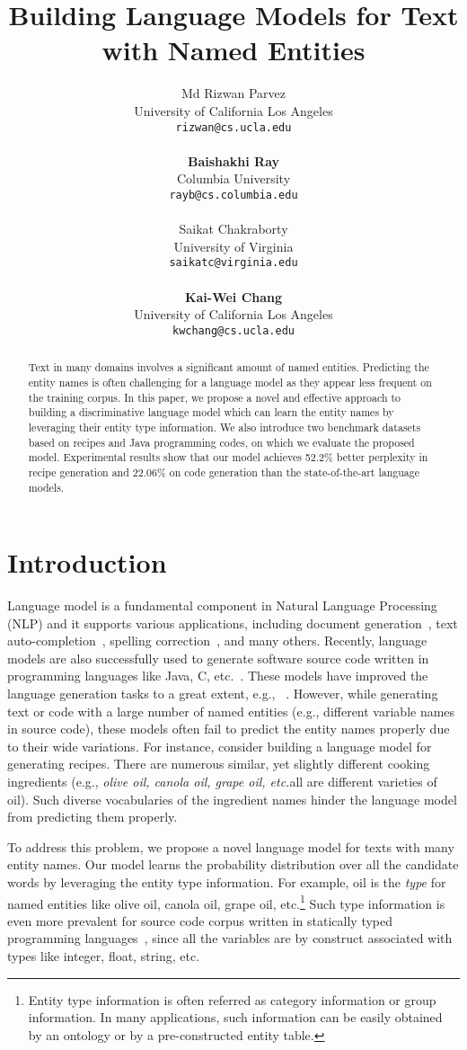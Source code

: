 \documentclass[11pt,a4paper]{article}
\title{Building Language Models for Text with Named Entities}
\author{
Md Rizwan Parvez \\
University of California Los Angeles \\
 {\tt rizwan@cs.ucla.edu} \\ 
 \\
  {\bf Baishakhi Ray}
\\
Columbia University  \\
 {\tt rayb@cs.columbia.edu} \\ 
 \\ \And Saikat Chakraborty \\
University of Virginia \\
 {\tt saikatc@virginia.edu} \\
 \\
{\bf Kai-Wei Chang}\\
University of California Los Angeles \\
 {\tt kwchang@cs.ucla.edu}
}
\date{}
\begin{document}
\maketitle
\begin{abstract}

Text in many domains involves a significant amount of named entities. Predicting the entity names is often challenging for a language model as they appear less frequent on the training corpus. In this paper, we propose a novel and effective approach to building a discriminative language model which can learn the entity names by leveraging their entity type information. We also introduce two benchmark datasets based on recipes and Java programming codes, on which we evaluate the proposed model. Experimental results show that our model achieves 52.2\% better perplexity in recipe generation and 22.06\% on code generation than the state-of-the-art language models.
\end{abstract}


\section{Introduction}


Language model is a fundamental component in Natural Language Processing (NLP) and it supports various applications, including document generation~\cite{Harvard_data_to_document}, text auto-completion~\cite{ACK17}, spelling correction~\cite{spelling}, and many others. Recently, language models are also successfully used to generate software source code written in programming languages like Java, C, etc.~\cite{naturalnessofsoft,cmu_code_gen,deep_net_for_source_code,code_gen_parsing}. These models have improved the language generation tasks to a great extent, e.g., ~\cite{mikolov2010,Sordoni}. However, while generating text or code with a large number of named entities (e.g., different variable names in source code), these models often fail to predict the entity names properly due to their wide variations.  For instance, consider building a language model for generating recipes. There are numerous similar, yet slightly different cooking ingredients  (e.g., {\it olive oil, canola oil, grape oil, etc.}\textemdash all are different varieties of oil). Such diverse  vocabularies of the ingredient names hinder the language model from predicting them properly. 






To address this problem, we propose a novel language model for texts with many entity names. Our model learns the probability distribution over all the candidate words by leveraging the entity type information. For example, oil is the {\em type} for named entities like olive oil, canola oil, grape oil, etc.\footnote{Entity type information is often referred as category information or group information. In many applications, such information can be easily obtained by an ontology or by a pre-constructed entity table.} 
Such type information is even more prevalent for source code corpus written in statically typed programming languages~\cite{bruce1993safe}, since all the  variables are by construct associated with types like integer, float, string, etc. 
\end{document}
